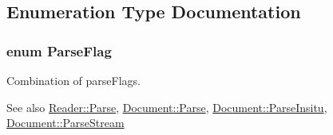 \subsection{Enumeration Type Documentation}
\subsubsection[{\texorpdfstring{Parse\+Flag}{ParseFlag}}]{\setlength{\rightskip}{0pt plus 5cm}enum {\bf Parse\+Flag}}\hypertarget{a00683_ab7be7dabe6ffcba60fad441505583450}{}\label{a00683_ab7be7dabe6ffcba60fad441505583450}


Combination of parse\+Flags. 

\begin{DoxySeeAlso}{See also}
\hyperlink{a00122_a0c450620d14ff1824e58bb7bd9b42099}{Reader\+::\+Parse}, \hyperlink{a00115_aadee36db7064cc9894a75c848831cdae}{Document\+::\+Parse}, \hyperlink{a00115_a301f8f297a5a0da4b6be5459ad766f75}{Document\+::\+Parse\+Insitu}, \hyperlink{a00115_afe94c0abc83a20f2d7dc1ba7677e6238}{Document\+::\+Parse\+Stream} 
\end{DoxySeeAlso}
